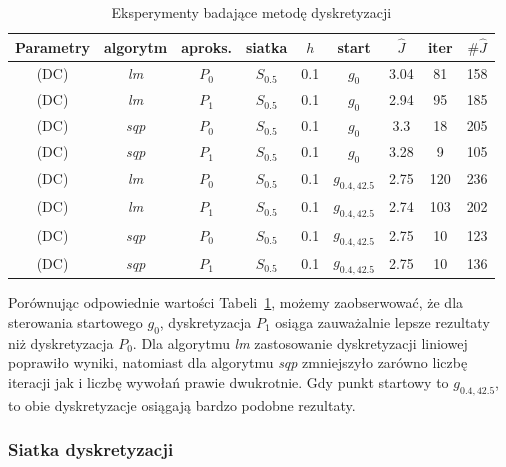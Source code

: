 \documentclass[11pt]{article}
\begin{document}
\begin{table}[h!]
  \begin{center}
    \begin{tabular}{|c|c|c|c|c|c|c|c|c|}
      \hline
      Parametry & algorytm & aproks. & siatka & $h$ & start & $\hat{J}$ & iter & $\#\hat{J}$ \\
      \hline
      (DC) & {\it lm\/} & $P_0$ & $S_{0.5}$ & 0.1 & $g_0$ & 3.04 & 81 & 158 \\
      \hline
      (DC) & {\it lm\/} & $P_1$ & $S_{0.5}$ & 0.1 & $g_0$ & 2.94 & 95 & 185 \\
      \hline
      (DC) & {\it sqp\/} & $P_0$ & $S_{0.5}$ & 0.1 & $g_0$ & 3.3 & 18 & 205 \\
      \hline
      (DC) & {\it sqp\/} & $P_1$ & $S_{0.5}$ & 0.1 & $g_0$ & 3.28 & 9 & 105 \\
      \hline
      (DC) & {\it lm\/} & $P_0$ & $S_{0.5}$ & 0.1 & $g_{0.4,42.5}$ & 2.75 & 120 & 236 \\
      \hline
      (DC) & {\it lm\/} & $P_1$ & $S_{0.5}$ & 0.1 & $g_{0.4,42.5}$ & 2.74 & 103 & 202 \\
      \hline
      (DC) & {\it sqp\/} & $P_0$ & $S_{0.5}$ & 0.1 & $g_{0.4,42.5}$ & 2.75 & 10 & 123 \\
      \hline
      (DC) & {\it sqp\/} & $P_1$ & $S_{0.5}$ & 0.1 & $g_{0.4,42.5}$ & 2.75 & 10 & 136 \\
      \hline
    \end{tabular}
    \caption{Eksperymenty badające metodę dyskretyzacji}\label{discr_tbl}
  \end{center}
\end{table}

Porównując odpowiednie wartości Tabeli~\ref{discr_tbl}, możemy zaobserwować, że dla sterowania startowego $g_0$, dyskretyzacja $P_1$ osiąga zauważalnie lepsze rezultaty niż dyskretyzacja $P_0$. Dla algorytmu {\it lm\/} zastosowanie dyskretyzacji liniowej poprawiło wyniki, natomiast dla algorytmu {\it sqp\/} zmniejszyło zarówno liczbę iteracji jak i liczbę wywołań prawie dwukrotnie. Gdy punkt startowy to $g_{0.4,42.5}$, to obie dyskretyzacje osiągają bardzo podobne rezultaty.

\subsubsection{Siatka dyskretyzacji}
\end{document}
